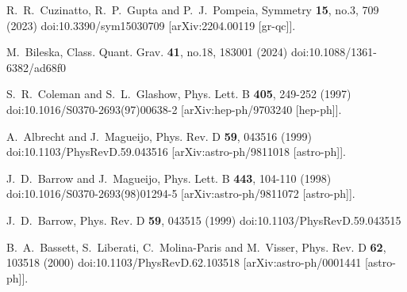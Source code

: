 \documentclass[jkps,preprint,fleqn]{revtex4} %
\begin{document}
\begin{thebibliography}{999}
R.~R.~Cuzinatto, R.~P.~Gupta and P.~J.~Pompeia,
Symmetry \textbf{15}, no.3, 709 (2023)
doi:10.3390/sym15030709
[arXiv:2204.00119 [gr-qc]].


M.~Bileska,
Class. Quant. Grav. \textbf{41}, no.18, 183001 (2024)
doi:10.1088/1361-6382/ad68f0


S.~R.~Coleman and S.~L.~Glashow,
Phys. Lett. B \textbf{405}, 249-252 (1997)
doi:10.1016/S0370-2693(97)00638-2
[arXiv:hep-ph/9703240 [hep-ph]].

A.~Albrecht and J.~Magueijo,
Phys. Rev. D \textbf{59}, 043516 (1999)
doi:10.1103/PhysRevD.59.043516
[arXiv:astro-ph/9811018 [astro-ph]].

J.~D.~Barrow and J.~Magueijo,
Phys. Lett. B \textbf{443}, 104-110 (1998)
doi:10.1016/S0370-2693(98)01294-5
[arXiv:astro-ph/9811072 [astro-ph]].

J.~D.~Barrow,
Phys. Rev. D \textbf{59}, 043515 (1999)
doi:10.1103/PhysRevD.59.043515

B.~A.~Bassett, S.~Liberati, C.~Molina-Paris and M.~Visser,
Phys. Rev. D \textbf{62}, 103518 (2000)
doi:10.1103/PhysRevD.62.103518
[arXiv:astro-ph/0001441 [astro-ph]].


\end{thebibliography}
\end{document}
